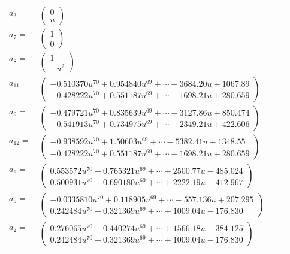 \documentclass[1p]{elsarticle_modified}
\theoremstyle{definition}
\begin{document}
\begin{tabular}{m{7pt} m{180pt} m{7pt} m{180pt} }
\flushright $a_{3}=$&$\begin{pmatrix}0\\u\end{pmatrix}$ \\
\flushright $a_{7}=$&$\begin{pmatrix}1\\0\end{pmatrix}$ \\
\flushright $a_{8}=$&$\begin{pmatrix}1\\- u^2\end{pmatrix}$ \\
\flushright $a_{11}=$&$\begin{pmatrix}-0.510370 u^{70}+0.954840 u^{69}+\cdots-3684.20 u+1067.89\\-0.428222 u^{70}+0.551187 u^{69}+\cdots-1698.21 u+280.659\end{pmatrix}$ \\
\flushright $a_{9}=$&$\begin{pmatrix}-0.479721 u^{70}+0.835639 u^{69}+\cdots-3127.86 u+850.474\\-0.541913 u^{70}+0.734975 u^{69}+\cdots-2349.21 u+422.606\end{pmatrix}$ \\
\flushright $a_{12}=$&$\begin{pmatrix}-0.938592 u^{70}+1.50603 u^{69}+\cdots-5382.41 u+1348.55\\-0.428222 u^{70}+0.551187 u^{69}+\cdots-1698.21 u+280.659\end{pmatrix}$ \\
\flushright $a_{6}=$&$\begin{pmatrix}0.553572 u^{70}-0.765321 u^{69}+\cdots+2500.77 u-485.024\\0.500931 u^{70}-0.690180 u^{69}+\cdots+2222.19 u-412.967\end{pmatrix}$ \\
\flushright $a_{5}=$&$\begin{pmatrix}-0.0335810 u^{70}+0.118905 u^{69}+\cdots-557.136 u+207.295\\0.242484 u^{70}-0.321369 u^{69}+\cdots+1009.04 u-176.830\end{pmatrix}$ \\
\flushright $a_{2}=$&$\begin{pmatrix}0.276065 u^{70}-0.440274 u^{69}+\cdots+1566.18 u-384.125\\0.242484 u^{70}-0.321369 u^{69}+\cdots+1009.04 u-176.830\end{pmatrix}$ \\

\end{tabular}
\end{document}
